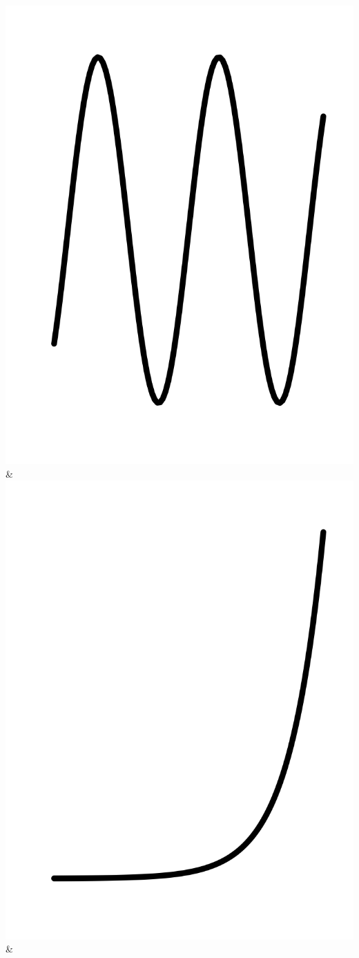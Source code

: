 \documentclass[
  letterpaper,
  DIV=11,
  numbers=noendperiod,
  oneside]{article}
\begin{document}
\begin{multicols}{2}
\begin{table}
\begin{minipage}[t]{\linewidth}
{\begin{longtable}[]
\includegraphics{Preliminaries/www/pb-sin.png} &
\includegraphics{Preliminaries/www/pb-exp.png} &

\end{longtable}}
\end{minipage}
\end{table}
\end{multicols}
\end{document}
